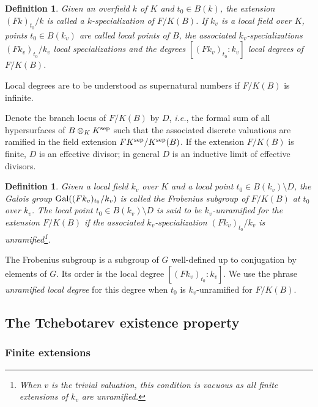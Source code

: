 \documentclass[12pt,english]{amsart}
\newtheorem{twisting lemma}[theorem]{Twisting lemma}
\newtheorem{definition}[theorem]{Definition}
\begin{document}
\begin{definition}
Given an overfield $k$ of $K$ and 
$t_0\in B(k)$, the extension  $(Fk)_{t_0}/k$ is called a \emph{$k$-specialization of $F/K(B)$}. If $k_v$ is a local field over $K$, points $t_0 \in B(k_v)$ are
called {\it local points} of $B$, the associated $k_v$-specializations $(Fk_v)_{t_0}/k_v$ {\it local specializations} and the degrees $[(Fk_v)_{t_0}:k_v]$ {\it local degrees} of $F/K(B)$.
\end{definition}

Local degrees are to be understood as supernatural numbers \cite[\S 22.8]{FrJa} if $F/K(B)$ is infinite. 

Denote the branch locus of $F/K(B)$ by $D$, {\it i.e.}, the formal sum of all hypersurfaces of $B\otimes_K K^{{\scriptsize\hbox{\rm sep}}}$ such that the associated discrete valuations are ramified in the field extension $F K^{{\scriptsize\hbox{\rm sep}}}/K^{{\scriptsize\hbox{\rm sep}}}(B)$.  If the extension $F/K(B)$ is finite, $D$ is an effective divisor; in general $D$ is an inductive limit of effective divisors. 

\begin{definition}
Given a local field $k_v$ over $K$ and a local point $t_0\in B(k_v)\setminus D$, the Galois group ${\hbox{\rm Gal}}((Fk_v)_{t_0}/k_v)$ is called the {\it Frobenius subgroup} of $F/K(B)$ at $t_0$ over $k_v$. The local point $t_0\in B(k_v)\setminus D$ is said to be {\it $k_v$-unramified} for the extension $F/K(B)$ if the associated $k_v$-specialization $(Fk_v)_{t_0}/k_v$ is unramified\footnote{When $v$ is the trivial valuation, this condition is vacuous as all finite extensions of $k_v$ are unramified.}. 
 \end{definition}
 

The Frobenius subgroup is a subgroup of $G$ well-defined up to conjugation by elements of $G$. Its order is the local degree $[(Fk_v)_{t_0}:k_v]$. We use the phrase {\it unramified local degree} for this degree when $t_0$ is $k_v$-unramified for $F/K(B)$.

\subsection{The Tchebotarev existence property} \label{sec:tchebotarev}

\subsubsection{Finite extensions} \label{ssec:finite-extensions}
\end{document}
